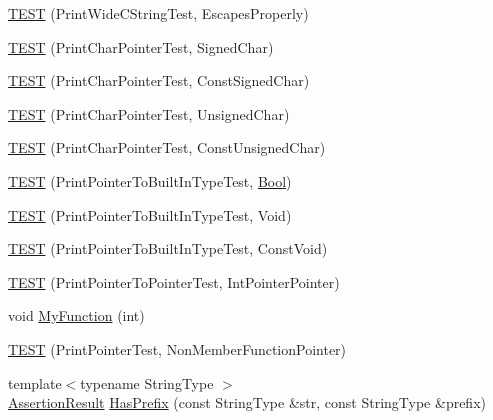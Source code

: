 \begin{DoxyCompactItemize}
\item 
\hyperlink{namespacetesting_1_1gtest__printers__test_aa80d6bb47e6bf997dacf0c75322d12cf}{\-T\-E\-S\-T} (\-Print\-Wide\-C\-String\-Test, \-Escapes\-Properly)
\item 
\hyperlink{namespacetesting_1_1gtest__printers__test_acd7a56709621a91dca669023d192bdc7}{\-T\-E\-S\-T} (\-Print\-Char\-Pointer\-Test, \-Signed\-Char)
\item 
\hyperlink{namespacetesting_1_1gtest__printers__test_ae854b0ca4d06ffc273c391f262884681}{\-T\-E\-S\-T} (\-Print\-Char\-Pointer\-Test, \-Const\-Signed\-Char)
\item 
\hyperlink{namespacetesting_1_1gtest__printers__test_afb9a6a26323b287b7666b6adb5bdb149}{\-T\-E\-S\-T} (\-Print\-Char\-Pointer\-Test, \-Unsigned\-Char)
\item 
\hyperlink{namespacetesting_1_1gtest__printers__test_aa0487f8fd5052f7d6afe2b18ad7931f9}{\-T\-E\-S\-T} (\-Print\-Char\-Pointer\-Test, \-Const\-Unsigned\-Char)
\item 
\hyperlink{namespacetesting_1_1gtest__printers__test_ad08dcd672b1e66a802a564eb974c400a}{\-T\-E\-S\-T} (\-Print\-Pointer\-To\-Built\-In\-Type\-Test, \hyperlink{structBool}{\-Bool})
\item 
\hyperlink{namespacetesting_1_1gtest__printers__test_ac6d8b84db9386b399eb431b5b1668e87}{\-T\-E\-S\-T} (\-Print\-Pointer\-To\-Built\-In\-Type\-Test, \-Void)
\item 
\hyperlink{namespacetesting_1_1gtest__printers__test_a8819fb42392faae72e8bc594d498085d}{\-T\-E\-S\-T} (\-Print\-Pointer\-To\-Built\-In\-Type\-Test, \-Const\-Void)
\item 
\hyperlink{namespacetesting_1_1gtest__printers__test_afee54807b15b623718c62008bd743d4b}{\-T\-E\-S\-T} (\-Print\-Pointer\-To\-Pointer\-Test, \-Int\-Pointer\-Pointer)
\item 
void \hyperlink{namespacetesting_1_1gtest__printers__test_adf0e590d6776ecb7095a989ff2272d7b}{\-My\-Function} (int)
\item 
\hyperlink{namespacetesting_1_1gtest__printers__test_aa3cb60cf6f3a4a0cd7d9873cd597ffd8}{\-T\-E\-S\-T} (\-Print\-Pointer\-Test, \-Non\-Member\-Function\-Pointer)
\item 
{\footnotesize template$<$typename String\-Type $>$ }\\\hyperlink{classtesting_1_1AssertionResult}{\-Assertion\-Result} \hyperlink{namespacetesting_1_1gtest__printers__test_abbd436200da6c80944c8a7504fb56ea1}{\-Has\-Prefix} (const \-String\-Type \&str, const \-String\-Type \&prefix)
\item 

\end{DoxyCompactItemize}
